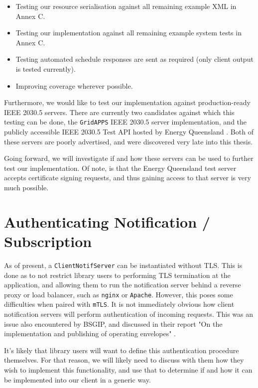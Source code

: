 \begin{itemize}
	\item Testing our resource serialisation against all remaining example XML in Annex C.
	\item Testing our implementation against all remaining example system tests in Annex C.
	\item Testing automated schedule responses are sent as required (only client output is tested currently).
	\item Improving coverage wherever possible.
\end{itemize}

Furthermore, we would like to test our implementation against production-ready IEEE 2030.5 servers. There are currently two candidates against which this testing can be done, the \texttt{GridAPPS} IEEE 2030.5 server implementation, and the publicly accessible IEEE 2030.5 Test API hosted by Energy Queensland \cite{sep2clienthandbook} \cite{gridapps}. Both of these servers are poorly advertised, and were discovered very late into this thesis.

Going forward, we will investigate if and how these servers can be used to further test our implementation. Of note, is that the Energy Queensland test server accepts certificate signing requests, and thus gaining access to that server is very much possible.

\section{Authenticating Notification / Subscription}
As of present, a \texttt{ClientNotifServer} can be instantiated without TLS. This is done as to not restrict library users to performing TLS termination at the application, and allowing them to run the notification server behind a reverse proxy or load balancer, such as \texttt{nginx} or \texttt{Apache}. 
However, this poses some difficulties when paired with \texttt{mTLS}. It is not immediately obvious how client notification servers will perform authentication of incoming requests. This was an issue also encountered  by BSGIP, and discussed in their report "On the implementation and publishing of operating envelopes" \cite{envoyclient}.

It's likely that library users will want to define this authentication  procedure themselves. For that reason, we will likely need to discuss with them how they wish to implement this functionality, and use that to determine if and how it can be implemented into our client in a generic way.


